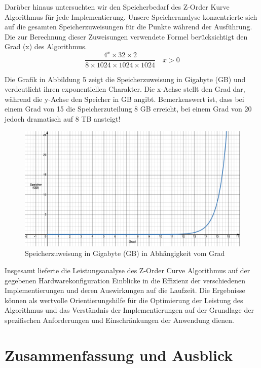 \documentclass[course=erap]{aspdoc}
\begin{document}
\noindent Darüber hinaus untersuchten wir den Speicherbedarf des Z-Order Kurve Algorithmus für jede Implementierung. Unsere Speicheranalyse konzentrierte sich auf die gesamten Speicherzuweisungen für die Punkte während der Ausführung. Die zur Berechnung dieser Zuweisungen verwendete Formel berücksichtigt den Grad (x) des Algorithmus.
\[
\frac{{4^x \times 32 \times 2}}{{8 \times 1024 \times 1024 \times 1024}}
\quad x > 0
\]
  


\noindent Die Grafik in Abbildung 5 zeigt die Speicherzuweisung in Gigabyte (GB) und verdeutlicht ihren exponentiellen Charakter. Die x-Achse stellt den Grad dar, während die y-Achse den Speicher in GB angibt. Bemerkenswert ist, dass bei einem Grad von 15 die Speicherzuteilung 8 GB erreicht, bei einem Grad von 20 jedoch dramatisch auf 8 TB ansteigt!
\bigskip
\begin{figure}[H]
  \centering
  \includegraphics[width=1\textwidth]{speicherGraph}
  \caption{Speicherzuweisung in Gigabyte (GB) in Abhängigkeit vom Grad}
  \label{fig:speicherGraph}
\end{figure}

\bigskip
\noindent Insgesamt lieferte die Leistungsanalyse des Z-Order Curve Algorithmus auf der gegebenen Hardwarekonfiguration Einblicke in die Effizienz der verschiedenen Implementierungen und deren Auswirkungen auf die Laufzeit. Die Ergebnisse können als wertvolle Orientierungshilfe für die Optimierung der Leistung des Algorithmus und das Verständnis der Implementierungen auf der Grundlage der spezifischen Anforderungen und Einschränkungen der Anwendung dienen.


\section{Zusammenfassung und Ausblick}


{}
\end{document}
